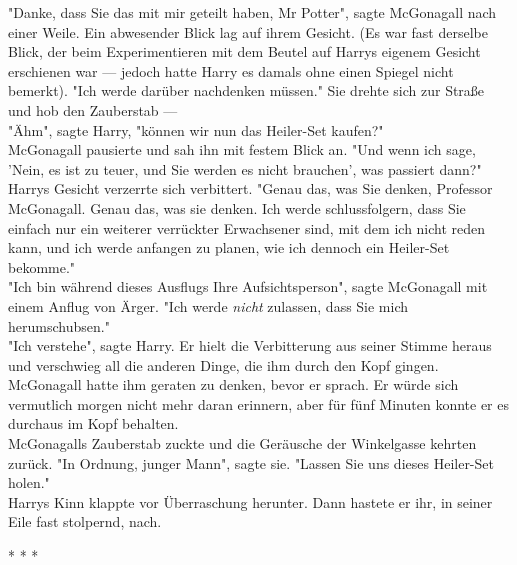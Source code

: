 {"Danke, dass Sie das mit mir geteilt haben, Mr Potter", sagte McGonagall nach einer Weile. Ein abwesender Blick lag auf ihrem Gesicht. (Es war fast derselbe Blick, der beim Experimentieren mit dem Beutel auf Harrys eigenem Gesicht erschienen war --- jedoch hatte Harry es damals ohne einen Spiegel nicht bemerkt). "Ich werde darüber nachdenken müssen." Sie drehte sich zur Straße und hob den Zauberstab ---\\ "Ähm", sagte Harry, "können wir nun das Heiler-Set kaufen?"\\ McGonagall pausierte und sah ihn mit festem Blick an. "Und wenn ich sage, 'Nein, es ist zu teuer, und Sie werden es nicht brauchen', was passiert dann?"\\ Harrys Gesicht verzerrte sich verbittert. "Genau das, was Sie denken, Professor McGonagall. Genau das, was sie denken. Ich werde schlussfolgern, dass Sie einfach nur ein weiterer verrückter Erwachsener sind, mit dem ich nicht reden kann, und ich werde anfangen zu planen, wie ich dennoch ein Heiler-Set bekomme."\\ "Ich bin während dieses Ausflugs Ihre Aufsichtsperson", sagte McGonagall mit einem Anflug von Ärger. "Ich werde \emph{nicht} zulassen, dass Sie mich herumschubsen."\\ "Ich verstehe", sagte Harry. Er hielt die Verbitterung aus seiner Stimme heraus und verschwieg all die anderen Dinge, die ihm durch den Kopf gingen. McGonagall hatte ihm geraten zu denken, bevor er sprach. Er würde sich vermutlich morgen nicht mehr daran erinnern, aber für fünf Minuten konnte er es durchaus im Kopf behalten.\\ McGonagalls Zauberstab zuckte und die Geräusche der Winkelgasse kehrten zurück. "In Ordnung, junger Mann", sagte sie. "Lassen Sie uns dieses Heiler-Set holen."\\ Harrys Kinn klappte vor Überraschung herunter. Dann hastete er ihr, in seiner Eile fast stolpernd, nach.

* * *

}
